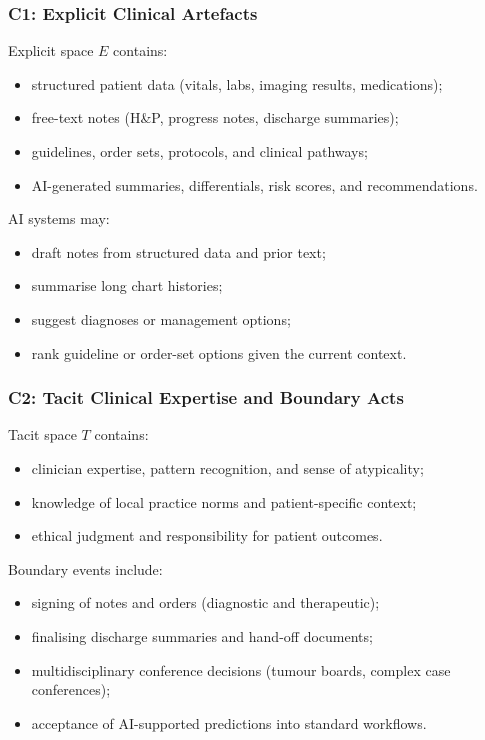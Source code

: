 \subsubsection*{C1: Explicit Clinical Artefacts}

Explicit space $E$ contains:

\begin{itemize}
  \item structured patient data (vitals, labs, imaging results, medications);
  \item free-text notes (H\&P, progress notes, discharge summaries);
  \item guidelines, order sets, protocols, and clinical pathways;
  \item AI-generated summaries, differentials, risk scores, and recommendations.
\end{itemize}

AI systems may:

\begin{itemize}
  \item draft notes from structured data and prior text;
  \item summarise long chart histories;
  \item suggest diagnoses or management options;
  \item rank guideline or order-set options given the current context.
\end{itemize}

\subsubsection*{C2: Tacit Clinical Expertise and Boundary Acts}

Tacit space $T$ contains:

\begin{itemize}
  \item clinician expertise, pattern recognition, and sense of atypicality;
  \item knowledge of local practice norms and patient-specific context;
  \item ethical judgment and responsibility for patient outcomes.
\end{itemize}

Boundary events include:

\begin{itemize}
  \item signing of notes and orders (diagnostic and therapeutic);
  \item finalising discharge summaries and hand-off documents;
  \item multidisciplinary conference decisions (tumour boards, complex case
        conferences);
  \item acceptance of AI-supported predictions into standard workflows.
\end{itemize}

